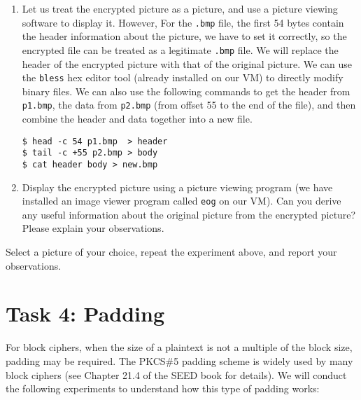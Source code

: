 \begin{enumerate}
\item Let us treat the encrypted picture as
a picture, and use a picture viewing software to display it. However,
For the {\tt .bmp} file, the first 54 bytes contain the header information
about the picture, we have to set it correctly, so
the encrypted file can be treated as a legitimate {\tt .bmp} file.
We will replace the header of the encrypted picture
with that of the original picture. We can use
the \texttt{bless} hex editor tool (already installed
on our VM) to directly modify binary files. We can also use the
following commands to get the header from \texttt{p1.bmp},
the data from \texttt{p2.bmp} (from offset 55 to the end of the file),
and then combine the header and data
together into a new file.

\begin{lstlisting}
$ head -c 54 p1.bmp  > header
$ tail -c +55 p2.bmp > body
$ cat header body > new.bmp
\end{lstlisting}


\item Display the encrypted picture using a picture
viewing program (we have installed an image viewer program called
\texttt{eog} on our VM).
Can you derive any useful information
about the original picture from the encrypted picture?
Please explain your observations.

\end{enumerate}

Select a  picture of your choice, repeat the experiment above,
and report your observations.




\section{Task 4: Padding}

For block ciphers, when the size of a plaintext is not a multiple
of the block size, padding may be required.
The PKCS\#5 padding scheme is widely used by many block
ciphers (see Chapter 21.4 of the SEED book for details).
We will conduct the following experiments to
understand how this type of padding works:

